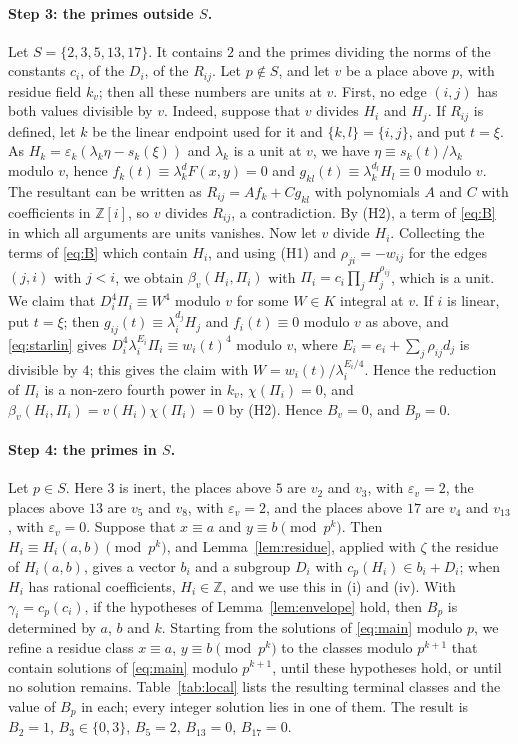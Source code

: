 \documentclass[11pt]{article}
\newcommand{\Z}{\mathbb{Z}}
\begin{document}
\paragraph{Step 3: the primes outside $S$.} Let $S=\{2,3,5,13,17\}$. It contains $2$ and the primes dividing the norms of the constants $c_i$, of the $D_i$, of the $R_{ij}$. Let $p\notin S$, and let $v$ be a place above $p$, with residue field $k_v$; then all these numbers are units at $v$. First, no edge $(i,j)$ has both values divisible by $v$. Indeed, suppose that $v$ divides $H_i$ and $H_j$. If $R_{ij}$ is defined, let $k$ be the linear endpoint used for it and $\{k,l\}=\{i,j\}$, and put $t=\xi$. As $H_k=\varepsilon_k(\lambda_k\eta-s_k(\xi))$ and $\lambda_k$ is a unit at $v$, we have $\eta\equiv s_k(t)/\lambda_k$ modulo $v$, hence $f_k(t)\equiv\lambda_k^dF(x,y)=0$ and $g_{kl}(t)\equiv\lambda_k^{d_l}H_l\equiv0$ modulo $v$. The resultant can be written as $R_{ij}=Af_k+Cg_{kl}$ with polynomials $A$ and $C$ with coefficients in $\Z[i]$, so $v$ divides $R_{ij}$, a contradiction. By (H2), a term of \eqref{eq:B} in which all arguments are units vanishes. Now let $v$ divide $H_i$. Collecting the terms of \eqref{eq:B} which contain $H_i$, and using (H1) and $\rho_{ji}=-w_{ij}$ for the edges $(j,i)$ with $j<i$, we obtain $\beta_v(H_i,\Pi_i)$ with $\Pi_i=c_i\prod_jH_j^{\rho_{ij}}$, which is a unit. We claim that $D_i^4\Pi_i\equiv W^4$ modulo $v$ for some $W\in K$ integral at $v$. If $i$ is linear, put $t=\xi$; then $g_{ij}(t)\equiv\lambda_i^{d_j}H_j$ and $f_i(t)\equiv0$ modulo $v$ as above, and \eqref{eq:starlin} gives $D_i^4\lambda_i^{E_i}\Pi_i\equiv w_i(t)^4$ modulo $v$, where $E_i=e_i+\sum_j\rho_{ij}d_j$ is divisible by $4$; this gives the claim with $W=w_i(t)/\lambda_i^{E_i/4}$. Hence the reduction of $\Pi_i$ is a non-zero fourth power in $k_v$, $\chi(\Pi_i)=0$, and $\beta_v(H_i,\Pi_i)=v(H_i)\chi(\Pi_i)=0$ by (H2). Hence $B_v=0$, and $B_p=0$.

\paragraph{Step 4: the primes in $S$.} Let $p\in S$. Here $3$ is inert, the places above $5$ are $v_{2}$ and $v_{3}$, with $\varepsilon_v=2$, the places above $13$ are $v_{5}$ and $v_{8}$, with $\varepsilon_v=2$, and the places above $17$ are $v_{4}$ and $v_{13}$, with $\varepsilon_v=0$. Suppose that $x\equiv a$ and $y\equiv b\pmod{p^k}$. Then $H_i\equiv H_i(a,b)\pmod{p^k}$, and Lemma~\ref{lem:residue}, applied with $\zeta$ the residue of $H_i(a,b)$, gives a vector $b_i$ and a subgroup $D_i$ with $c_p(H_i)\in b_i+D_i$; when $H_i$ has rational coefficients, $H_i\in\Z$, and we use this in (i) and (iv). With $\gamma_i=c_p(c_i)$, if the hypotheses of Lemma~\ref{lem:envelope} hold, then $B_p$ is determined by $a$, $b$ and $k$. Starting from the solutions of \eqref{eq:main} modulo $p$, we refine a residue class $x\equiv a$, $y\equiv b\pmod{p^k}$ to the classes modulo $p^{k+1}$ that contain solutions of \eqref{eq:main} modulo $p^{k+1}$, until these hypotheses hold, or until no solution remains. Table~\ref{tab:local} lists the resulting terminal classes and the value of $B_p$ in each; every integer solution lies in one of them. The result is $B_{2}=1$, $B_{3}\in\{0,3\}$, $B_{5}=2$, $B_{13}=0$, $B_{17}=0$.
\end{document}
